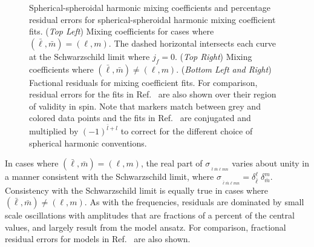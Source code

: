 \documentclass[twocolumn,aps,prd,floatfix,preprintnumbers,a4paper,nofootinbib,
superscriptaddress,10pt]{revtex4-1}
\def\jf{j_f}
\def\LMlmn{_{\bar{\ell} \bar{m} \ell m n}}
\begin{document}
\begin{figure}[htb]
\begin{tabular}{ll}
  \end{tabular}
	\caption{ Spherical-spheroidal harmonic mixing coefficients and percentage residual errors for spherical-spheroidal harmonic mixing coefficient fits. (\textit{Top Left}) Mixing coefficients for cases where $(\bar{\ell},\bar{m})=(\ell,m)$. The dashed horizontal intersects each curve at the Schwarzschild limit where $\jf=0$. (\textit{Top Right}) Mixing coefficients where $(\bar{\ell},\bar{m})\neq(\ell,m)$. (\textit{Bottom Left and Right}) Factional residuals for mixing coefficient fits. For comparison, residual errors for the fits in Ref.~\cite{Berti:2014fga} are also shown over their region of validity in \bh{} spin. Note that markers match between grey and colored data points and the fits in Ref.~\cite{Berti:2014fga} are conjugated and multiplied by $(-1)^{\bar{l}+l}$ to correct for the different choice of spherical harmonic conventions.}
  \label{fig:ys}
\end{figure}
%
In cases where $(\bar\ell,\bar{m})=(\ell,m)$, the real part of $\sigma_{\LMlmn}$ varies about unity in a manner consistent with the Schwarzschild limit, where $\sigma_{\LMlmn}=\delta_{\bar\ell}^{\ell}\;\delta_{\bar{m}}^{m}$.
%
Consistency with the Schwarzschild limit is equally true in cases where $(\bar\ell,\bar{m}) \neq (\ell,m)$.
%
As with the \qnm{} frequencies, residuals are dominated by small scale oscillations with amplitudes that are fractions of a percent of the central values, and largely result from the model ansatz.
%
For comparison, fractional residual errors for models in Ref.~\cite{Berti:2014fga} are also shown.
%
\end{document}
